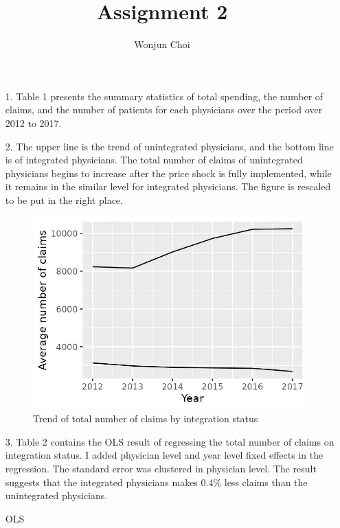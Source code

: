 \documentclass[12pt]{article}
\title{Assignment 2}
\author{Wonjun Choi}
\begin{document}
\maketitle
	\begin{itemize}
		\item[1.] Table 1 presents the summary statistics of total spending, the number of claims, and the number of patients for each physicians over the period over 2012 to 2017.
		
		
		
		\item[2.] The upper line is the trend of unintegrated physicians, and the bottom line is of integrated physicians. The total number of claims of unintegrated physicians begins to increase after the price shock is fully implemented, while it remains in the similar level for integrated physicians. The figure is rescaled to be put in the right place.
		\begin{figure} [ht]
			\centering
			\includegraphics[scale=0.2]{fig_claim_by_int.jpg}
			\caption{Trend of total number of claims by integration status}
		\end{figure}
		
		\item[3.] Table 2 contains the OLS result of regressing the total number of claims on integration status. I added physician level and year level fixed effects in the regression. The standard error was clustered in physician level. The result suggests that the integrated physicians makes 0.4\% less claims than the unintegrated physicians.
		
		\begin{table} [ht]
	    
	    \caption{OLS}
		\end{table}


\end{itemize}
\end{document}
